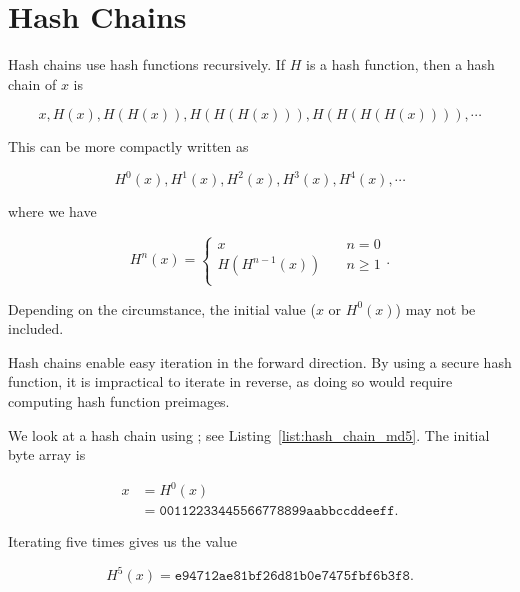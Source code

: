 \section{Hash Chains}

Hash chains use \glspl{hash function} recursively.
If $H$ is a \gls{hash function}, then a hash chain of $x$ is

\begin{equation}
    x, H(x), H(H(x)), H(H(H(x))), H(H(H(H(x)))), \cdots
\end{equation}

\noindent
This can be more compactly written as

\begin{equation}
    H^{0}(x), H^{1}(x), H^{2}(x), H^{3}(x), H^{4}(x), \cdots
\end{equation}

\noindent
where we have

\begin{equation}
    H^{n}(x) = \begin{cases}
            x\quad &n = 0 \\
            H(H^{n-1}(x))\quad &n \ge 1 \\
    \end{cases}.
\end{equation}

\noindent
Depending on the circumstance, the initial value ($x$ or $H^{0}(x)$)
may not be included.

Hash chains enable easy iteration in the forward direction.
By using a secure \gls{hash function}, it is impractical to iterate in reverse,
as doing so would require computing \gls{hash function} preimages.

\begin{example}

We look at a hash chain using \MDFive{};
see Listing~\ref{list:hash_chain_md5}.
The initial byte array is

\begin{align}
    x &= H^{0}(x) \nonumber\\
        &= \texttt{00112233445566778899aabbccddeeff}.
\end{align}



\noindent
Iterating \MDFive{} five times gives us the value

\begin{equation}
    H^{5}(x) = \texttt{e94712ae81bf26d81b0e7475fbf6b3f8}.
\end{equation}
\end{example}


